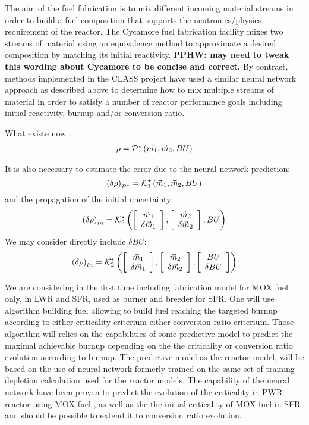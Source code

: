 \documentclass[dvips,12pt]{article}
\newcommand{\unc}[1]
{ \delta #1 }
\newcommand{\uncvector}[1]
{ \left[ \begin{array}{c} #1 \\ \delta #1 \end{array} \right] }
\newcommand{\comment}[1]
{{\bfseries \color{red} #1}}
\begin{document}
The aim of the fuel fabrication is to mix
different incoming material streams in order to
build a fuel composition that supports the
neutronics/physics requirement of the reactor. The
Cycamore fuel fabrication facility mixes two
streams of material using an equivalence method to
approximate a desired composition by matching its
initial reactivity.  \cite{cycamore_fab}
\comment{PPHW: may need to tweak this wording
  about Cycamore to be concise and correct.}  By
contrast, methods implemented in the CLASS project
have used a similar neural network approach as
described above to determine how to mix multiple
streams of material in order to satisfy a number
of reactor performance goals including initial
reactivity, burnup and/or conversion ratio.


What existe now :
\begin{align}
  \rho &= {\cal P^{\star}}\left( \vec{m}_{1},\vec{m}_{2}, BU \right)\\
\end{align}

It is also necessary to estimate the error due to
the neural network prediction:
\begin{equation}
  \left(\unc{\rho}\right)_{\cal P^\star} = {\cal K}_1^{\star}\left( \vec{m}_{1},\vec{m}_{2}, BU \right)
\end{equation}
and the propagation of the initial uncertainty:
\begin{equation}
  \left(\unc{\rho}\right)_{in} = {\cal K}^{\star}_2\left( \uncvector{\vec{m}_{1}},\uncvector{\vec{m}_{2}}, BU \right)
\end{equation}
We may consider directly include $\delta BU$:
\begin{equation}
  \left(\unc{\rho}\right)_{in} = {\cal K}^{\star}_2\left( \uncvector{\vec{m}_{1}},\uncvector{\vec{m}_{2}}, \uncvector{BU} \right)
\end{equation}

We are considering in the first time including
fabrication model for MOX fuel only, in LWR and
SFR, used as burner and breeder for SFR. One will
use algorithm building fuel allowing to build fuel
reaching the targeted burnup according to either
criticality criterium either conversion ratio
criterium.  Those algorithm will relies on the
capabilities of some predictive model to predict
the maximal achievable burnup depending on the the
criticality or conversion ratio evolution
according to burnup.  The predictive model as the
reactor model, will be based on the use of neural
network formerly trained on the same set of
training depletion calculation used for the
reactor models. The capability of the neural
network have been proven to predict the evolution
of the criticality in PWR reactor using MOX fuel
\cite{Leniaux.NN, CLASS_UserManual}, as well as
the the initial criticality of MOX fuel in SFR
\cite{CLASS UserManual} and should be possible to
extend it to conversion ratio evolution.
\end{document}
